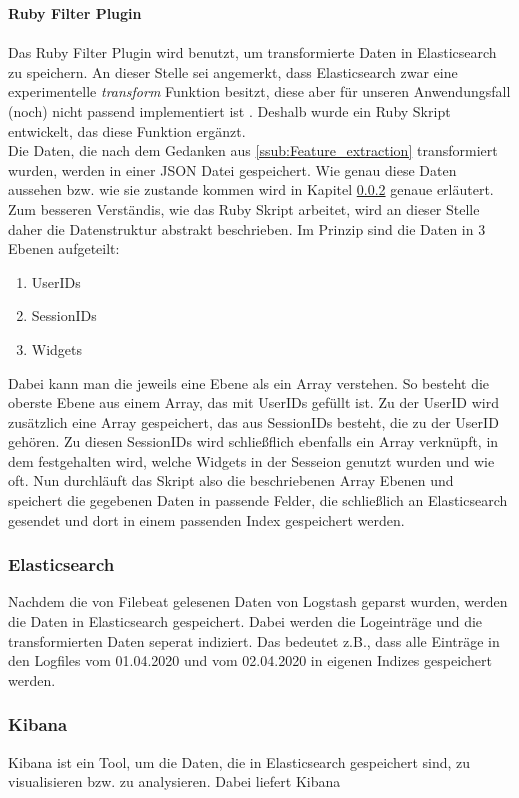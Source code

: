 \textbf{Ruby Filter Plugin}\\
\\
Das Ruby Filter Plugin wird benutzt, um transformierte Daten in Elasticsearch zu speichern. An dieser Stelle sei angemerkt, dass Elasticsearch zwar eine experimentelle \textit{transform} Funktion besitzt, diese aber für unseren Anwendungsfall (noch) nicht passend implementiert ist \citep{ElTr20}. Deshalb wurde ein Ruby Skript entwickelt, das diese Funktion ergänzt.\\

Die Daten, die nach dem Gedanken aus \ref{ssub:Feature_extraction} transformiert wurden, werden in einer JSON Datei gespeichert. Wie genau diese Daten aussehen bzw. wie sie zustande kommen wird in Kapitel \ref{ssub:Kibana} genaue erläutert. Zum besseren Verständis, wie das Ruby Skript arbeitet, wird an dieser Stelle daher die Datenstruktur abstrakt beschrieben.
Im Prinzip sind die Daten in 3 Ebenen aufgeteilt:\\
\begin{enumerate}
	\item UserIDs
	\item SessionIDs
	\item Widgets
\end{enumerate}
Dabei kann man die jeweils eine Ebene als ein Array verstehen. So besteht die oberste Ebene aus einem Array, das mit UserIDs gefüllt ist. Zu der UserID wird zusätzlich eine Array gespeichert, das aus SessionIDs besteht, die zu der UserID gehören. Zu diesen SessionIDs wird schließflich ebenfalls ein Array verknüpft, in dem festgehalten wird, welche Widgets in der Sesseion genutzt wurden und wie oft. Nun durchläuft das Skript also die beschriebenen Array Ebenen und speichert die gegebenen Daten in passende Felder, die schließlich an Elasticsearch gesendet und dort in einem passenden Index gespeichert werden.

\subsubsection{Elasticsearch}
\label{ssub:Elasticsearch}
Nachdem die von Filebeat gelesenen Daten von Logstash geparst wurden, werden die Daten in Elasticsearch gespeichert. Dabei werden die Logeinträge und die transformierten Daten seperat indiziert. Das bedeutet z.B., dass alle Einträge in den Logfiles vom 01.04.2020 und vom 02.04.2020 in eigenen Indizes gespeichert werden.

\subsubsection{Kibana}
\label{ssub:Kibana}
Kibana ist ein Tool, um die Daten, die in Elasticsearch gespeichert sind, zu visualisieren bzw. zu analysieren. Dabei liefert Kibana 
